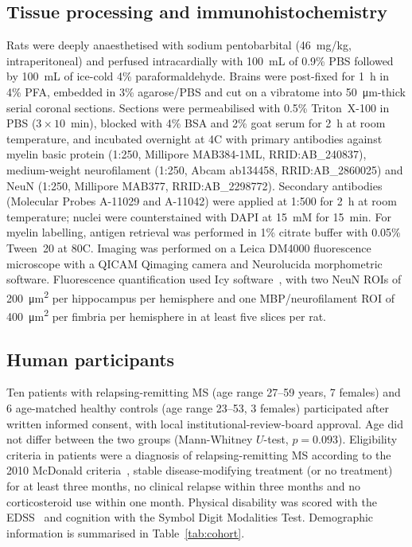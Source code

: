 \documentclass[11pt]{article}
\begin{document}
\subsection{Tissue processing and immunohistochemistry}
Rats were deeply anaesthetised with sodium pentobarbital (\SI{46}{mg/kg}, intraperitoneal) and perfused intracardially with \SI{100}{mL} of 0.9\% PBS followed by \SI{100}{mL} of ice-cold 4\% paraformaldehyde. Brains were post-fixed for 1~h in 4\% PFA, embedded in 3\% agarose/PBS and cut on a vibratome into \SI{50}{\micro\meter}-thick serial coronal sections. Sections were permeabilised with 0.5\% Triton~X-100 in PBS ($3\times10$~min), blocked with 4\% BSA and 2\% goat serum for 2~h at room temperature, and incubated overnight at 4\textdegree C with primary antibodies against myelin basic protein (1:250, Millipore MAB384-1ML, RRID:AB\_240837), medium-weight neurofilament (1:250, Abcam ab134458, RRID:AB\_2860025) and NeuN (1:250, Millipore MAB377, RRID:AB\_2298772). Secondary antibodies (Molecular Probes A-11029 and A-11042) were applied at 1:500 for 2~h at room temperature; nuclei were counterstained with DAPI at 15~mM for 15~min. For myelin labelling, antigen retrieval was performed in 1\% citrate buffer with 0.05\% Tween~20 at 80\textdegree C. Imaging was performed on a Leica DM4000 fluorescence microscope with a QICAM Qimaging camera and Neurolucida morphometric software. Fluorescence quantification used Icy software~\cite{dechaumont2012icy}, with two NeuN ROIs of \SI{200}{\micro\meter\squared} per hippocampus per hemisphere and one MBP/neurofilament ROI of \SI{400}{\micro\meter\squared} per fimbria per hemisphere in at least five slices per rat.

\subsection{Human participants}
Ten patients with relapsing-remitting MS (age range 27--59 years, 7 females) and 6 age-matched healthy controls (age range 23--53, 3 females) participated after written informed consent, with local institutional-review-board approval. Age did not differ between the two groups (Mann-Whitney $U$-test, $p=0.093$). Eligibility criteria in patients were a diagnosis of relapsing-remitting MS according to the 2010 McDonald criteria~\cite{polman2011diagnostic}, stable disease-modifying treatment (or no treatment) for at least three months, no clinical relapse within three months and no corticosteroid use within one month. Physical disability was scored with the EDSS~\cite{kurtzke1983rating} and cognition with the Symbol Digit Modalities Test. Demographic information is summarised in Table~\ref{tab:cohort}.
\end{document}
